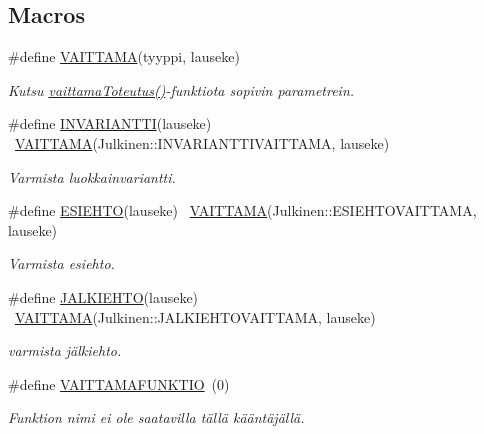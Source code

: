 \subsection*{Macros}
\begin{DoxyCompactItemize}
\item 
\#define \hyperlink{vaittama_8hh_a6b096e740ddb310436f150269693aed8}{V\+A\+I\+T\+T\+A\+M\+A}(tyyppi,  lauseke)                                                                      
\begin{DoxyCompactList}\small\item\em Kutsu \hyperlink{namespace_julkinen_ad6f59e70f19f914c38369d67c20a0ea5}{vaittama\+Toteutus()}-\/funktiota sopivin parametrein. \end{DoxyCompactList}\item 
\#define \hyperlink{vaittama_8hh_a0aeb6df8d7b8888c097af8cea604afb5}{I\+N\+V\+A\+R\+I\+A\+N\+T\+T\+I}(lauseke)                                                                                ~\hyperlink{vaittama_8hh_a6b096e740ddb310436f150269693aed8}{V\+A\+I\+T\+T\+A\+M\+A}(Julkinen\+::\+I\+N\+V\+A\+R\+I\+A\+N\+T\+T\+I\+V\+A\+I\+T\+T\+A\+M\+A, lauseke)
\begin{DoxyCompactList}\small\item\em Varmista luokkainvariantti. \end{DoxyCompactList}\item 
\#define \hyperlink{vaittama_8hh_aeee94f72ed67ad120c1b012609d6aa34}{E\+S\+I\+E\+H\+T\+O}(lauseke)                                                                                        ~\hyperlink{vaittama_8hh_a6b096e740ddb310436f150269693aed8}{V\+A\+I\+T\+T\+A\+M\+A}(Julkinen\+::\+E\+S\+I\+E\+H\+T\+O\+V\+A\+I\+T\+T\+A\+M\+A, lauseke)
\begin{DoxyCompactList}\small\item\em Varmista esiehto. \end{DoxyCompactList}\item 
\#define \hyperlink{vaittama_8hh_ac7dd8221a0b8c27d42ec91610bc4632e}{J\+A\+L\+K\+I\+E\+H\+T\+O}(lauseke)                                                                                    ~\hyperlink{vaittama_8hh_a6b096e740ddb310436f150269693aed8}{V\+A\+I\+T\+T\+A\+M\+A}(Julkinen\+::\+J\+A\+L\+K\+I\+E\+H\+T\+O\+V\+A\+I\+T\+T\+A\+M\+A, lauseke)
\begin{DoxyCompactList}\small\item\em varmista jälkiehto. \end{DoxyCompactList}\item 
\hypertarget{vaittama_8hh_ab33be5ce915422889f1084ad272c1171}{}\#define \hyperlink{vaittama_8hh_ab33be5ce915422889f1084ad272c1171}{V\+A\+I\+T\+T\+A\+M\+A\+F\+U\+N\+K\+T\+I\+O}~(0)\label{vaittama_8hh_ab33be5ce915422889f1084ad272c1171}

\begin{DoxyCompactList}\small\item\em Funktion nimi ei ole saatavilla tällä kääntäjällä. \end{DoxyCompactList}\end{DoxyCompactItemize}
